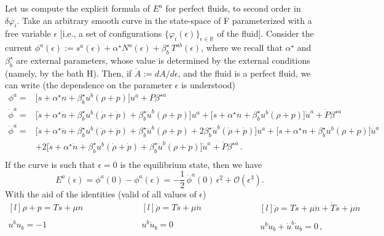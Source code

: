 \documentclass[aps,prl,reprint,nofootinbib]{revtex4-1}
\newcommand{\spc}{\quad \quad \quad}
\begin{document}
Let us compute the explicit formula of $E^a$ for perfect fluids, to second order in $\delta \varphi_i$. Take an arbitrary smooth curve in the state-space of F parameterized with a free variable $\epsilon$ [i.e., a set of configurations $\{\varphi_i(\epsilon)\}_{\epsilon \in \mathbb{R}}$ of the fluid]. Consider the current $\phi^a(\epsilon):= s^a(\epsilon)+\alpha^\star N^a(\epsilon)+\beta^\star_b \, T^{ab}(\epsilon)$, where we recall that $\alpha^\star$ and $\beta^\star_b$ are external parameters, whose value is determined by the external conditions (namely, by the bath H). Then, if $\dot{A}:=dA/d\epsilon$, and the fluid is a perfect fluid, we can write (the dependence on the parameter $\epsilon$ is understood)
\begin{equation}
\begin{split}
 \phi^a ={ } & \big[ s+\alpha^\star n + \beta_b^\star u^b (\rho+p) \big]u^a+P\beta^{\star a} \\ 
 \dot{\phi}^a ={ } & \big[ \dot{s}+\alpha^\star \dot{n} + \beta_b^\star u^b (\dot{\rho}+\dot{p})  + \beta_b^\star \dot{u}^b (\rho+p) \big]u^a+ \big[ s+\alpha^\star n + \beta_b^\star u^b (\rho+p) \big]\dot{u}^a +\dot{P}\beta^{\star a} \\
 \ddot{\phi}^a ={ } & \big[ \ddot{s}+\alpha^\star \ddot{n} + \beta_b^\star u^b (\ddot{\rho}+\ddot{p})  + \beta_b^\star \ddot{u}^b (\rho+p) +2\beta_b^\star \dot{u}^b (\dot{\rho}+\dot{p}) \big]u^a+ \big[ s+\alpha^\star n + \beta_b^\star u^b (\rho+p) \big]\ddot{u}^a \\ & +2 \big[ \dot{s}+\alpha^\star \dot{n} + \beta_b^\star u^b (\dot{\rho}+\dot{p})  + \beta_b^\star \dot{u}^b (\rho+p) \big]\dot{u}^a+\ddot{P}\beta^{\star a} \, . \\
\end{split}
\end{equation}
If the curve is such that $\epsilon=0$ is the equilibrium state, then we have
\begin{equation}
E^a (\epsilon) = \phi^a(0)-\phi^a(\epsilon) = -\dfrac{1}{2} \, \ddot{\phi}^a(0)  \, \epsilon^2 + \mathcal{O}(\epsilon^3).
\end{equation}
With the aid of the identities (valid of all values of $\epsilon$)
\begin{equation}
\begin{matrix*}[l]
\rho+p=Ts+\mu n \\
\\
u^b u_b=-1 \\
\end{matrix*}
\spc \spc
\begin{matrix*}[l]
\dot{\rho}=T\dot{s}+\mu \dot{n} \\
\\
u^b \dot{u}_b=0 \\
\end{matrix*}
\spc \spc
\begin{matrix*}[l]
 \ddot{\rho}=T\ddot{s}+\mu \ddot{n} + \dot{T}\dot{s}+\dot{\mu}\dot{n} \\
\\
u^b \ddot{u}_b +\dot{u}^b \dot{u}_b=0 \, ,\\
\end{matrix*}
\end{equation}
\end{document}
